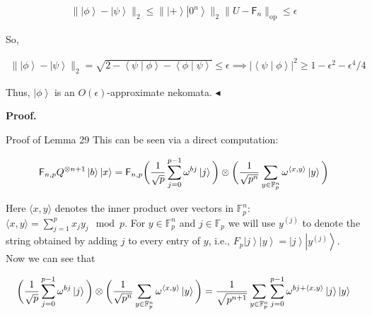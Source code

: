 \[\begin{gathered}
\displaystyle\|\left|\phi\right\rangle-\left|\psi\right\rangle\|_{2}\leq\|\left|+\right\rangle\left|0^{n}\right\rangle\|_{2}\|U-\mathsf{F}_{n}\|_{\mathrm{op}}\leq\epsilon
\end{gathered}\]


So,\par


\[\begin{gathered}
\displaystyle\|\left|\phi\right\rangle-\left|\psi\right\rangle\|_{2} \displaystyle=\sqrt{2-\left\langle\psi\middle|\phi\right\rangle-\left\langle\phi\middle|\psi\right\rangle}\leq\epsilon\implies|\left\langle\psi\middle|\phi\right\rangle|^{2}\geq 1-\epsilon^{2}-\epsilon^{4}/4
\end{gathered}\]


Thus, $\left|\phi\right\rangle$ is an $O(\epsilon)$-approximate nekomata.
$\blacktriangleleft$\par





\par\medskip\noindent\textbf{Proof.}\par




Proof of Lemma 29
This can be seen via a direct computation:\par


\[\begin{gathered}
\displaystyle\mathsf{F}_{n,p}Q^{\otimes{n+1}}\left|b\right\rangle\left|x\right\rangle \displaystyle=\mathsf{F}_{n,p}\bigg{(}\frac{1}{\sqrt{p}}\sum_{j=0}^{p-1}\omega^{bj}\left|j\right\rangle\bigg{)}\otimes\bigg{(}\frac{1}{\sqrt{p^{n}}}\sum_{y\in\mathbb{F}_{p}^{n}}\omega^{\langle x,y\rangle}\left|y\right\rangle\bigg{)}
\end{gathered}\]


Here $\langle x,y\rangle$ denotes the inner product over vectors in $\mathbb{F}_{p}^{n}$: $\langle x,y\rangle=\sum_{j=1}^{p}x_{j}y_{j}\mod{p}$. For $y\in\mathbb{F}_{p}^{n}$ and $j\in\mathbb{F}_{p}$ we will use $y^{(j)}$ to denote the string obtained by adding $j$ to every entry of $y$, i.e., $F_{p}\left|j\right\rangle\left|y\right\rangle=\left|j\right\rangle\left|y^{(j)}\right\rangle$. Now we can see that\par


\[\begin{gathered}
\displaystyle\bigg{(}\frac{1}{\sqrt{p}}\sum_{j=0}^{p-1}\omega^{bj}\left|j\right\rangle\bigg{)}\otimes\bigg{(}\frac{1}{\sqrt{p^{n}}}\sum_{y\in\mathbb{F}_{p}^{n}}\omega^{\langle x,y\rangle}\left|y\right\rangle\bigg{)}=\frac{1}{\sqrt{p^{n+1}}}\sum_{y\in\mathbb{F}_{p}^{n}}\sum_{j=0}^{p-1}\omega^{bj+\langle
x,y\rangle}\left|j\right\rangle\left|y\right\rangle
\end{gathered}\]


